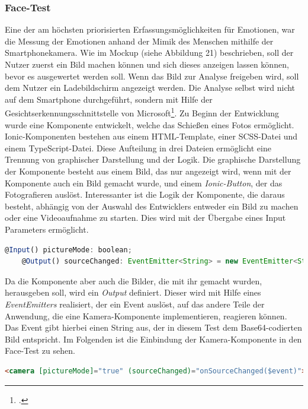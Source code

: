 \subsubsection{Face-Test}
Eine der am höchsten priorisierten Erfassungsmöglichkeiten für Emotionen, war die Messung der Emotionen anhand der Mimik des Menschen mithilfe der Smartphonekamera. Wie im Mockup (siehe Abbildung 21) beschrieben, soll der Nutzer zuerst ein Bild machen können und sich dieses anzeigen lassen können, bevor es ausgewertet werden soll. Wenn das Bild zur Analyse freigeben wird, soll dem Nutzer ein Ladebildschirm angezeigt werden. Die Analyse selbst wird nicht auf dem Smartphone durchgeführt, sondern mit Hilfe der Gesichtserkennungsschnittstelle von Microsoft\footcite[siehe ][]{Mic18}.\newline
Zu Beginn der Entwicklung wurde eine Komponente entwickelt, welche das Schießen eines Fotos ermöglicht. Ionic-Komponenten bestehen aus einem HTML-Template, einer SCSS-Datei und einem TypeScript-Datei. Diese Aufteilung in drei Dateien ermöglicht eine Trennung von graphischer Darstellung und der Logik. Die graphische Darstellung der Komponente besteht aus einem Bild, das nur angezeigt wird, wenn mit der Komponente auch ein Bild gemacht wurde, und einem \textit{Ionic-Button}, der das Fotografieren auslöst. Interessanter ist die Logik der Komponente, die daraus besteht, abhängig von der Auswahl des Entwicklers entweder ein Bild zu machen oder eine Videoaufnahme zu starten. Dies wird mit der Übergabe eines Input Parameters ermöglicht. \newline
\begin{lstlisting}[caption={Input und Output der Kamera Komponente}, language=JavaScript]
	@Input() pictureMode: boolean;
	@Output() sourceChanged: EventEmitter<String> = new EventEmitter<String>();
\end{lstlisting}
Da die Komponente aber auch die Bilder, die mit ihr gemacht wurden, herausgeben soll, wird ein \textit{Output} definiert. Dieser wird mit Hilfe eines \textit{EventEmitters} realisiert, der ein Event auslöst, auf das andere Teile der Anwendung, die eine Kamera-Komponente implementieren, reagieren können. Das Event gibt hierbei einen String aus, der in diesem Test dem Base64-codierten Bild entspricht. Im Folgenden ist die Einbindung der Kamera-Komponente in den Face-Test zu sehen. \newline \newline
\begin{lstlisting}[caption={Einbindung Kamera Komponente}, language=HTML]
	<camera [pictureMode]="true" (sourceChanged)="onSourceChanged($event)"></camera>
\end{lstlisting}

